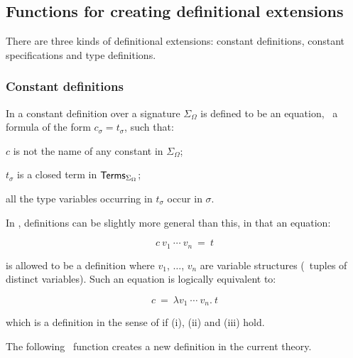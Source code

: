\subsection{Functions for creating definitional extensions}
\label{avra_definitional}

There are three kinds of definitional extensions:
constant definitions, constant specifications and type definitions.

\subsubsection{Constant definitions}
\label{sec:constant-definitions}

In \LOGIC{} a constant definition
%
%
over a signature $\Sigma_{\Omega}$ is defined to be an equation, \ie\
a formula of the form $c_{\sigma}=t_{\sigma}$, such that:
\begin{myenumerate}
\item $c$ is not the name of any constant in $\Sigma_{\Omega}$;
\item $t_{\sigma}$ is a closed term in ${\sf Terms}_{\Sigma_{\Omega}}$;
\item all the type variables occurring in $t_{\sigma}$ occur in $\sigma$.
\end{myenumerate}

In \HOL, definitions can be slightly more general than this, in that
an equation:

\[ c\ v_1\ \cdots\ v_n\ =\ t \]

\noindent is  allowed  to  be a  definition where  $v_1$, $\dots$, $v_n$ are
variable structures (\ie\ tuples of distinct variables).   Such  an equation is
logically equivalent to:

\[ c\ =\ \lambda v_1\ \cdots\ v_n.\  t \]

\noindent which is a definition in the sense of \LOGIC{} if (i),
(ii) and (iii) hold.

The following  \ML\ function  creates a  new definition in
the current theory.

